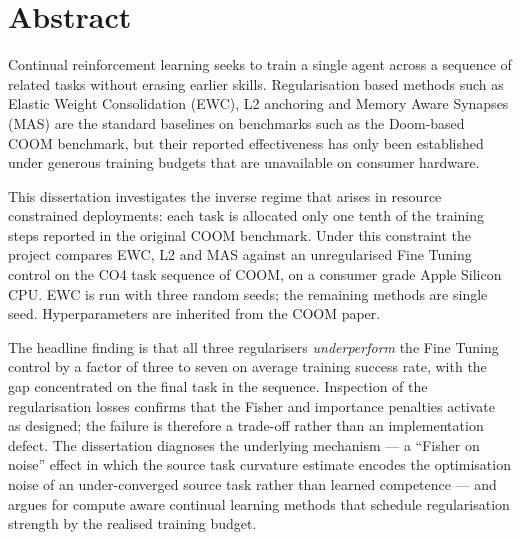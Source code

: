 \cleardoublepage
\chapter*{Abstract}
\thispagestyle{anonymous}

Continual reinforcement learning seeks to train a single agent across a
sequence of related tasks without erasing earlier skills.
Regularisation based methods such as Elastic Weight Consolidation (EWC),
L2 anchoring and Memory Aware Synapses (MAS) are the standard
baselines on benchmarks such as the Doom-based COOM benchmark, but
their reported effectiveness has only been established under generous
training budgets that are unavailable on consumer hardware.

This dissertation investigates the inverse regime that arises in
resource constrained deployments: each task is allocated only one tenth
of the training steps reported in the original COOM benchmark. Under
this constraint the project compares EWC, L2 and MAS against an
unregularised Fine Tuning control on the CO4 task sequence of COOM, on
a consumer grade Apple Silicon CPU. EWC is run with three random
seeds; the remaining methods are single seed. Hyperparameters are
inherited from the COOM paper.

The headline finding is that all three regularisers
\emph{underperform} the Fine Tuning control by a factor of three to
seven on average training success rate, with the gap concentrated on
the final task in the sequence. Inspection of the regularisation
losses confirms that the Fisher and importance penalties activate as
designed; the failure is therefore a trade-off rather than an
implementation defect. The dissertation diagnoses the underlying
mechanism --- a ``Fisher on noise'' effect in which the source task
curvature estimate encodes the optimisation noise of an
under-converged source task rather than learned competence --- and
argues for compute aware continual learning methods that schedule
regularisation strength by the realised training budget.

